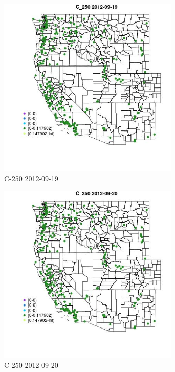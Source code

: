 \begin{figure} 
\centering  
\includegraphics[width=0.77\textwidth]{Code_Outputs/ML_input_report_ML_input_PM25_Step5_part_d_de_duplicated_aves_ML_input_MapObsC_2502012-09-19.jpg} 
\caption{\label{fig:ML_input_report_ML_input_PM25_Step5_part_d_de_duplicated_aves_ML_inputMapObsC_2502012-09-19}C-250 2012-09-19} 
\end{figure} 
 

\begin{figure} 
\centering  
\includegraphics[width=0.77\textwidth]{Code_Outputs/ML_input_report_ML_input_PM25_Step5_part_d_de_duplicated_aves_ML_input_MapObsC_2502012-09-20.jpg} 
\caption{\label{fig:ML_input_report_ML_input_PM25_Step5_part_d_de_duplicated_aves_ML_inputMapObsC_2502012-09-20}C-250 2012-09-20} 
\end{figure} 
 

